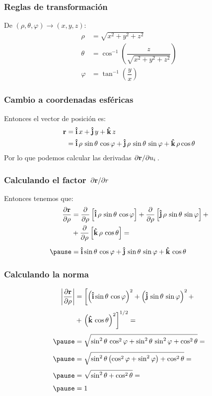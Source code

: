 \documentclass[12pt]{beamer}
\begin{document}
\begin{frame}
\frametitle{Reglas de transformación}
De $(\rho, \theta, \varphi) \rightarrow (x, y, z)$:
\begin{align*}
\rho &= \sqrt{x^{2} + y^{2} + z^{2}} \\[0.75em]
\theta &= \cos^{-1} \left( \dfrac{z}{\sqrt{x^{2} + y^{2} + z^{2}}} \right) \\[0.75em]
\varphi &= \tan^{-1} \left( \dfrac{y}{x} \right)
\end{align*}
\end{frame}
\begin{frame}
\frametitle{Cambio a coordenadas esféricas}
Entonces el vector de posición es:
\pause
\begin{align}
\begin{aligned}
\vb{r} &= \vu{i} \, x + \vu{j} \, y + \vu{k} \, z \\
&= \vu{i} \, \rho \, \sin \theta \, \cos \varphi + \vu{j} \, \rho \, \sin \theta \, \sin \varphi + \vu{k} \, \rho \cos \theta 
\end{aligned}
\label{eq:ecuacion_01_06}
\end{align}
\pause
Por lo que podemos calcular las derivadas $\pdv*{\vb{r}}{u_{i}}$.
\end{frame}
\begin{frame}
\frametitle{Calculando el factor $\pdv*{\vb{r}}{r}$}
Entonces tenemos que:
\pause
\begin{eqnarray*}
\begin{aligned}
\pdv{\vb{r}}{\rho} &= \pdv{\rho} \left[ \vu{i} \, \rho \, \sin \theta \, \cos \varphi \right] + \pdv{\rho} \left[ \vu{j} \, \rho \, \sin \theta \, \sin \varphi \right] + \\
&+ \pdv{\rho} \left[ \vu{k} \, \rho \, \cos \theta \right] = \\[0.5em] \pause
&= \vu{i} \sin \theta \, \cos \varphi + \vu{j} \, \sin \theta \, \sin \varphi + \vu{k} \, \cos \theta
\end{aligned}
\end{eqnarray*}
\end{frame}
\begin{frame}
\frametitle{Calculando la norma}
\begin{eqnarray*}
\begin{aligned}
\abs{\pdv{\vb{r}}{\rho}} &= \left[ \left( \vu{i} \sin \theta \, \cos \varphi \right)^{2} + \left( \vu{j} \, \sin \theta \, \sin \varphi \right)^{2} + \right. \\[0.35em]
&+ \left. \left( \vu{k} \, \cos \theta \right)^{2} \right]^{1/2} = \\[0.35em] \pause
&= \sqrt{\sin^{2} \theta \, \cos^{2} \varphi + \sin^{2} \theta \, \sin^{2} \varphi + \cos^{2} \theta} = \\[0.35em] \pause
&= \sqrt{\sin^{2} \theta \left( \cos^{2} \varphi + \sin^{2} \varphi \right) + \cos^{2} \theta} = \\[0.35em] \pause
&= \sqrt{\sin^{2} \theta + \cos^{2} \theta} = \\[0.35em] \pause
&= 1
\end{aligned}
\end{eqnarray*}
\end{frame}
\end{document}
